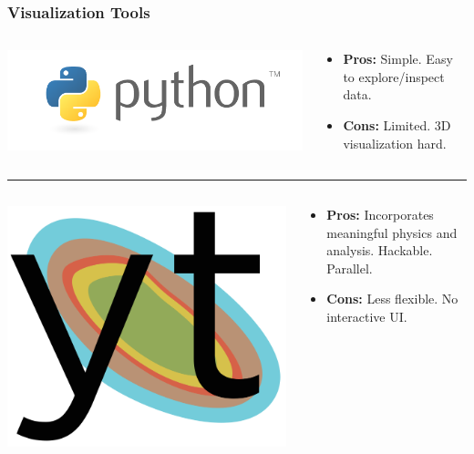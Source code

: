 \documentclass[]{beamer}
\begin{document}
\begin{frame}
  \frametitle{Visualization Tools}
  \begin{columns}
    \begin{column}{6cm}
      \begin{center}
        \includegraphics[width=0.9\columnwidth]{figures/python-logo-master-v3-TM}
      \end{center}
    \end{column}
    \begin{column}{6cm}
      \begin{itemize}
      \item \textbf{\color{green}Pros:} Simple. Easy to explore/inspect data.
      \item \textbf{\color{red}Cons:} Limited. 3D visualization hard.
      \end{itemize}
    \end{column}
  \end{columns}
  \noindent\rule{\textwidth}{1pt}
  \begin{columns}
    \begin{column}{6cm}
      \begin{center}
        \includegraphics[width=0.4\columnwidth]{figures/yt_logo}
      \end{center}
    \end{column}
    \begin{column}{6cm}
      \begin{itemize}
      \item \textbf{\color{green}Pros:} Incorporates meaningful
        physics and analysis. Hackable. Parallel.
      \item \textbf{\color{red}Cons:} Less flexible. No interactive UI.

\end{itemize}
\end{column}
\end{columns}
\end{frame}
\end{document}
